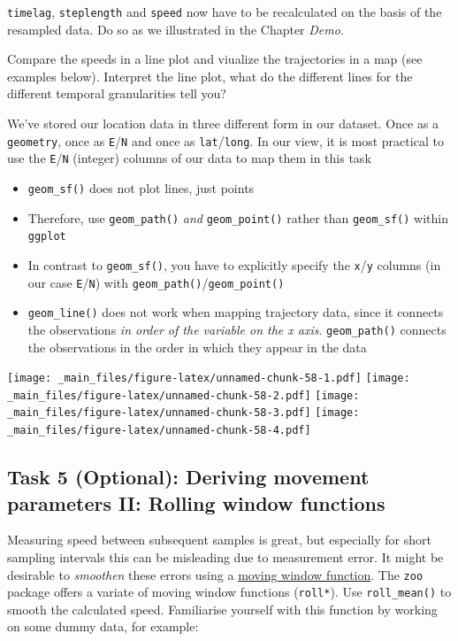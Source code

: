 \documentclass[]{book}
\providecommand{\tightlist}{%
  \setlength{\itemsep}{0pt}\setlength{\parskip}{0pt}}
\theoremstyle{definition}
\theoremstyle{definition}
\theoremstyle{definition}
\theoremstyle{remark}
\begin{document}
\texttt{timelag}, \texttt{steplength} and \texttt{speed} now have to be
recalculated on the basis of the resampled data. Do so as we illustrated
in the Chapter \emph{Demo}.

Compare the speeds in a line plot and viualize the trajectories in a map
(see examples below). Interpret the line plot, what do the different
lines for the different temporal granularities tell you?

We've stored our location data in three different form in our dataset.
Once as a \texttt{geometry}, once as \texttt{E}/\texttt{N} and once as
\texttt{lat}/\texttt{long}. In our view, it is most practical to use the
\texttt{E}/\texttt{N} (integer) columns of our data to map them in this
task

\begin{itemize}
\tightlist
\item
  \texttt{geom\_sf()} does not plot lines, just points
\item
  Therefore, use \texttt{geom\_path()} \emph{and} \texttt{geom\_point()}
  rather than \texttt{geom\_sf()} within \texttt{ggplot}
\item
  In contrast to \texttt{geom\_sf()}, you have to explicitly specify the
  \texttt{x}/\texttt{y} columns (in our case \texttt{E}/\texttt{N}) with
  \texttt{geom\_path()}/\texttt{geom\_point()}
\item
  \texttt{geom\_line()} does not work when mapping trajectory data,
  since it connects the observations \emph{in order of the variable on
  the x axis}. \texttt{geom\_path()} connects the observations in the
  order in which they appear in the data
\end{itemize}

\texttt{[image: \_main\_files/figure-latex/unnamed-chunk-58-1.pdf]}
\texttt{[image: \_main\_files/figure-latex/unnamed-chunk-58-2.pdf]}
\texttt{[image: \_main\_files/figure-latex/unnamed-chunk-58-3.pdf]}
\texttt{[image: \_main\_files/figure-latex/unnamed-chunk-58-4.pdf]}

\subsection{Task 5 (Optional): Deriving movement parameters II: Rolling
window
functions}\label{task-5-optional-deriving-movement-parameters-ii-rolling-window-functions}

Measuring speed between subsequent samples is great, but especially for
short sampling intervals this can be misleading due to measurement
error. It might be desirable to \emph{smoothen} these errors using a
\href{https://docs.wavefront.com/images/5sec_moving_window.png}{moving
window function}. The \texttt{zoo} package offers a variate of moving
window functions (\texttt{roll*}). Use \texttt{roll\_mean()} to smooth
the calculated speed. Familiarise yourself with this function by working
on some dummy data, for example:
\end{document}
